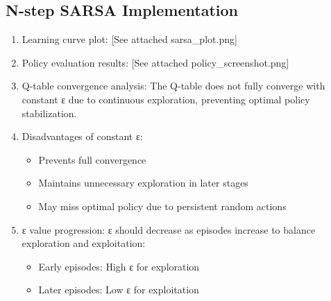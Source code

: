 \documentclass{article}
\begin{document}
\subsection{N-step SARSA Implementation}
\begin{enumerate}[label=(\arabic*)]
\item Learning curve plot: [See attached sarsa\_plot.png]

\item Policy evaluation results: [See attached policy\_screenshot.png]

\item Q-table convergence analysis:
The Q-table does not fully converge with constant ε due to continuous exploration, preventing optimal policy stabilization.

\item Disadvantages of constant ε:
\begin{itemize}
    \item Prevents full convergence
    \item Maintains unnecessary exploration in later stages
    \item May miss optimal policy due to persistent random actions
\end{itemize}

\item ε value progression:
ε should decrease as episodes increase to balance exploration and exploitation:
\begin{itemize}
    \item Early episodes: High ε for exploration
    \item Later episodes: Low ε for exploitation
\end{itemize}
\end{enumerate}
\end{document}
